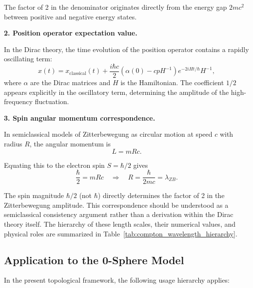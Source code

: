 \documentclass[%
 reprint,
 amsmath,amssymb,
 aps,
 prb,
]{revtex4-2}
\numberwithin{equation}{section}
\begin{document}
The factor of 2 in the denominator originates directly from the energy gap $2mc^2$ between positive and negative energy states.

\medskip
\noindent\textbf{2. Position operator expectation value.}

In the Dirac theory, the time evolution of the position operator contains a rapidly oscillating term:
\begin{equation}
x(t) = x_{\text{classical}}(t) + \frac{i\hbar c}{2} \left(\alpha(0) - cp H^{-1}\right) e^{-2iHt/\hbar} H^{-1},
\end{equation}
where $\alpha$ are the Dirac matrices and $H$ is the Hamiltonian. The coefficient $1/2$ appears explicitly in the oscillatory term, determining the amplitude of the high-frequency fluctuation.

\medskip
\noindent\textbf{3. Spin angular momentum correspondence.}

In semiclassical models of Zitterbewegung as circular motion at speed $c$ with radius $R$, the angular momentum is
\begin{equation}
L = mRc.
\end{equation}

Equating this to the electron spin $S = \hbar/2$ gives
\begin{equation}
\frac{\hbar}{2} = mRc \quad \Rightarrow \quad R = \frac{\hbar}{2mc} = \lambda_{ZB}.
\end{equation}

The spin magnitude $\hbar/2$ (not $\hbar$) directly determines the factor of 2 in the Zitterbewegung amplitude. This correspondence should be understood as a semiclassical consistency argument rather than a derivation within the Dirac theory itself. The hierarchy of these length scales, their numerical values, and physical roles are summarized in Table~\ref{tab:compton_wavelength_hierarchy}.


\subsection{Application to the 0-Sphere Model}

In the present topological framework, the following usage hierarchy applies:
\end{document}
